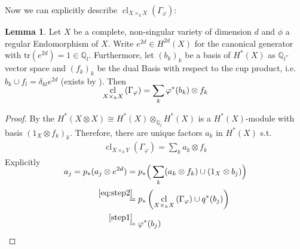 \documentclass[english,headsepline=0.25pt]{scrartcl}
\theoremstyle{definition}
\newtheorem{Lem}[Def]{Lemma}
\theoremstyle{remark}
\newcommand*{\Z}{\mathds{Z}}
\newcommand*{\Q}{\mathds{Q}}
\newcommand*{\Zl}{\Z_l} %
\newcommand*{\Ql}{\Q_l} %
\newcommand*{\idest}{i.e.\ }
\newcommand*{\Tr}{\text{tr}} %
\newcommand*{\tr}[1]{\Tr\left(#1\right)} %
\newcommand*{\Graph}[1]{{\Gamma_{#1}}} %
\DeclareMathOperator{\CL}{cl} %
\newcommand*{\cl}[2]{{\CL_{#1}\left(#2\right)}} %
\newcommand*{\one}[1]{{1_{#1}}}%
\let\altphi\phi
\renewcommand*{\phi}{\varphi}
\begin{document}
    Now we can explicitly describe
    $\cl{X\times_k X}{\Graph{\phi}}$:
    \begin{Lem}\label{clofgraph}
      Let $X$ be a complete, non-singular variety of dimension $d$
      and $\altphi$ a regular Endomorphism of $X$.
      Write $e^{2d}\in H^{2d}(X)$ for the canonical generator
      with $\tr{e^{2d}}=1\in\Ql$.
      Furthermore, let $(b_k)_k$ be a basis of $H^*(X)$ as
      $\Ql$-vector space and $(f_k)_k$ be the dual Basis with respect
      to the cup product, \idest $b_k\cup f_l=\delta_{kl}e^{2d}$
      (exists by ).
      Then
      \begin{gather*}
        \SwapAboveDisplaySkip
        \cl{X\times_k X}{\Graph{\phi}} =
        \sum_{k} \phi^*(b_k)\otimes  f_k
      \end{gather*}
      \begin{proof}
        By the  %
        $H^*(X\otimes X) \cong H^*(X)\otimes_{\Ql}H^*(X)$ is a
        $H^*(X)$-module with basis
        $(\one{X}\otimes f_k)_{k}$.
        Therefore, there are unique factors $a_{k}$ in $H^*(X)$ s.t.
        \begin{gather}
          \label{eq:step2}
          \cl{X\times_k Y}{\Graph{\phi}} =
          \sum_{k} a_k\otimes f_k
        \end{gather}
        Explicitly
        \begin{align*}
          \SwapAboveDisplaySkip
          a_j
          = p_*(a_j\otimes e^{2d})
          &= p_*\Big(
            \sum_k(a_k\otimes f_k)\cup (\one{X}\otimes b_j)
            \Big)\\
          &\overset{\mathllap{\eqref{eq:step2}}}= p_*\left(
            \cl{X\times_k X}{\Graph{\phi}} \cup q^*(b_j)
            \right)\\
          &\overset{\mathllap{\ref{step1}}}= \phi^*(b_j) 
        \end{align*}
      \end{proof}
    \end{Lem}
\end{document}
